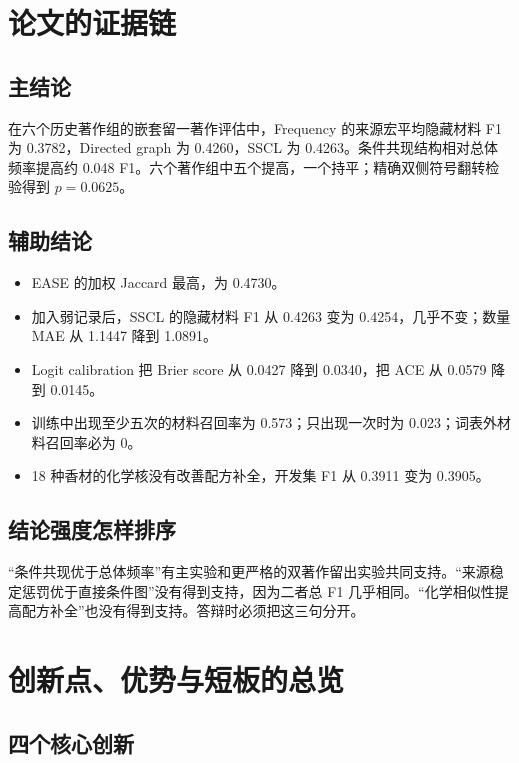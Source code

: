 \documentclass[UTF8,11pt,openany,fontset=none]{ctexbook}
\newcommand{\SSCL}{\textsc{SSCL}}
\begin{document}
\chapter{论文的证据链}

\section{主结论}

在六个历史著作组的嵌套留一著作评估中，Frequency 的来源宏平均隐藏材料 F1 为 0.3782，Directed graph 为 0.4260，\SSCL{} 为 0.4263。条件共现结构相对总体频率提高约 0.048 F1。六个著作组中五个提高，一个持平；精确双侧符号翻转检验得到 $p=0.0625$。

\section{辅助结论}

\begin{itemize}
\item EASE 的加权 Jaccard 最高，为 0.4730。
\item 加入弱记录后，\SSCL{} 的隐藏材料 F1 从 0.4263 变为 0.4254，几乎不变；数量 MAE 从 1.1447 降到 1.0891。
\item Logit calibration 把 Brier score 从 0.0427 降到 0.0340，把 ACE 从 0.0579 降到 0.0145。
\item 训练中出现至少五次的材料召回率为 0.573；只出现一次时为 0.023；词表外材料召回率必为 0。
\item 18 种香材的化学核没有改善配方补全，开发集 F1 从 0.3911 变为 0.3905。
\end{itemize}

\section{结论强度怎样排序}

“条件共现优于总体频率”有主实验和更严格的双著作留出实验共同支持。“来源稳定惩罚优于直接条件图”没有得到支持，因为二者总 F1 几乎相同。“化学相似性提高配方补全”也没有得到支持。答辩时必须把这三句分开。

\chapter{创新点、优势与短板的总览}

\section{四个核心创新}
\end{document}
